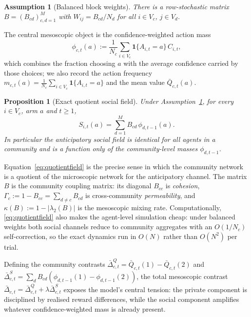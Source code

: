 \documentclass[11pt]{article}
\newtheorem{assumption}{Assumption}
\newtheorem{proposition}{Proposition}
\newcommand{\1}{\mathbf{1}}
\begin{document}
\begin{assumption}[Balanced block weights]
\label{ass:balanced}
There is a row-stochastic matrix $B=(B_{cd})_{c,d=1}^M$ with $W_{ij}=B_{cd}/N_d$
for all $i\in V_c$, $j\in V_d$.
\end{assumption}

The central mesoscopic object is the confidence-weighted action mass
\begin{equation}
\phi_{c,t}(a):=\frac1{N_c}\sum_{i\in V_c}\1\{A_{i,t}=a\}\,C_{i,t},
\label{eq:phi}
\end{equation}
which combines the fraction choosing $a$ with the average confidence carried by
those choices; we also record the action frequency
$m_{c,t}(a)=\frac1{N_c}\sum_{i\in V_c}\1\{A_{i,t}=a\}$ and the mean value
$\bar Q_{c,t}(a)$.

\begin{proposition}[Exact quotient social field]
\label{prop:quotient}
Under Assumption~\ref{ass:balanced}, for every $i\in V_c$, arm $a$ and $t\ge1$,
\begin{equation}
S_{i,t}(a)=\sum_{d=1}^M B_{cd}\,\phi_{d,t-1}(a).
\label{eq:quotientfield}
\end{equation}
In particular the anticipatory social field is identical for all agents in a
community and is a function only of the community-level masses
$\phi_{d,t-1}$.
\end{proposition}


Equation~\eqref{eq:quotientfield} is the precise sense in which the community
network is a quotient of the microscopic network for the anticipatory channel.
The matrix $B$ is the community coupling matrix: its diagonal $B_{cc}$ is
\emph{cohesion}, $\Gamma_c:=1-B_{cc}=\sum_{d\neq c}B_{cd}$ is cross-community
\emph{permeability}, and $\kappa(B):=1-|\lambda_2(B)|$ is the mesoscopic mixing
rate. Computationally, \eqref{eq:quotientfield} also makes the agent-level
simulation cheap: under balanced weights both social channels reduce to
community aggregates with an $O(1/N_c)$ self-correction, so the exact dynamics
run in $O(N)$ rather than $O(N^2)$ per trial.

Defining the community contrasts
$\bar\Delta^Q_{c,t}=\bar Q_{c,t}(1)-\bar Q_{c,t}(2)$ and
$\bar\Delta^S_{c,t}=\sum_d B_{cd}(\phi_{d,t-1}(1)-\phi_{d,t-1}(2))$, the total
mesoscopic contrast $\bar\Delta_{c,t}=\bar\Delta^Q_{c,t}+\lambda\bar\Delta^S_{c,t}$
exposes the model's central tension: the private component is disciplined by
realised reward differences, while the social component amplifies whatever
confidence-weighted mass is already present.
\end{document}
